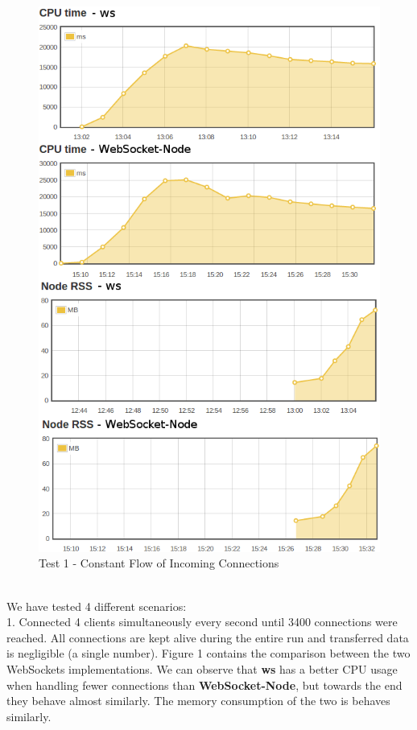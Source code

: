 \documentclass[conference]{IEEEtran}
\begin{document}
\begin{frame}{}
  \begin{figure}
    \centering
	\includegraphics[width=1\linewidth]{img/test1v2.png}
    \caption{Test 1 - Constant Flow of Incoming Connections}
  \end{figure}
\end{frame}
\\

We have tested 4 different scenarios:
\\

1. Connected 4 clients simultaneously every second until 3400 connections were reached.
All connections are kept alive during the entire run and transferred data is negligible
(a single number). Figure 1 contains the comparison between the two WebSockets
implementations. We can observe that \textbf{ws} has a better CPU usage when handling
fewer connections than \textbf{WebSocket-Node}, but towards the end they behave almost
similarly. The memory consumption of the two is behaves similarly.
\\
\end{document}
